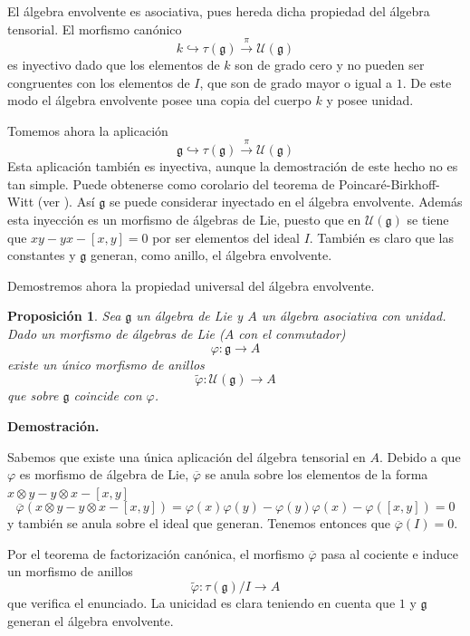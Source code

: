 \documentclass[a4paper,draft,12pt]{scrartcl}
\newtheorem{propo}[teo]{Proposición}%
\newcommand{\dem}{\noindent \textbf{Demostración. }\vspace{0.3 cm}}%
\newcommand{\uni}{\mathcal{U}}%
\newcommand{\lto}{\longrightarrow}%
\begin{document}
El álgebra envolvente es asociativa, pues hereda dicha propiedad del álgebra tensorial.  El morfismo canónico
$$
k \hookrightarrow \tau(\mathfrak{g}) \stackrel{\pi}{\lto} \uni(\mathfrak{g})
$$
es inyectivo dado que los elementos de $k$ son de grado cero y no pueden ser congruentes con los elementos de $I$, que son de grado mayor o igual a $1$.  De este modo el álgebra envolvente posee una copia del cuerpo $k$ y posee unidad.

Tomemos ahora la aplicación
$$
\mathfrak{g} \hookrightarrow \tau(\mathfrak{g}) \stackrel{\pi}{\lto} \uni(\mathfrak{g})
$$
Esta aplicación también es inyectiva, aunque la demostración de este hecho no es tan simple. Puede obtenerse como corolario del teorema de Poincaré-Birkhoff-Witt (ver \cite{humint}). Así $\mathfrak{g}$ se puede considerar inyectado en el álgebra envolvente.  Además esta inyección es un morfismo de álgebras de Lie, puesto que en $\uni(\mathfrak{g})$ se tiene que $xy-yx-[x,y]=0$ por ser elementos del ideal $I$.  También es claro que las constantes y $\mathfrak{g}$ generan, como anillo, el álgebra envolvente.

Demostremos ahora la propiedad universal del álgebra envolvente.

\begin{propo}

Sea $\mathfrak{g}$ un álgebra de Lie y $A$ un álgebra asociativa con unidad.  Dado un morfismo de álgebras de Lie ($A$ con el conmutador)
$$
\varphi: \mathfrak{g}\lto A
$$
existe un único morfismo de anillos
$$
\tilde \varphi: \uni(\mathfrak{g}) \lto A
$$
que sobre $\mathfrak{g}$ coincide con $\varphi$.

\end{propo}

\dem

Sabemos que existe una única aplicación del álgebra tensorial en $A$.  Debido a que $\varphi$ es morfismo de álgebra de Lie, $\overline{\varphi}$ se anula sobre los elementos de la forma $x \otimes y - y \otimes x -[x,y]$
$$
\overline{\varphi}(x \otimes y -y \otimes x - [x,y])= \varphi(x)\varphi(y)- \varphi(y)\varphi(x)- \varphi([x,y])=0
$$
y también se anula sobre el ideal que generan.  Tenemos entonces que $\overline{\varphi}(I)=0$.

Por el teorema de factorización canónica, el morfismo $\overline{\varphi}$ pasa al cociente e induce un morfismo de anillos
$$
\tilde \varphi: \tau(\mathfrak{g})/I \lto A
$$
que verifica el enunciado. La unicidad es clara teniendo en cuenta que $1$ y $\mathfrak{g}$ generan el álgebra envolvente.
\end{document}
